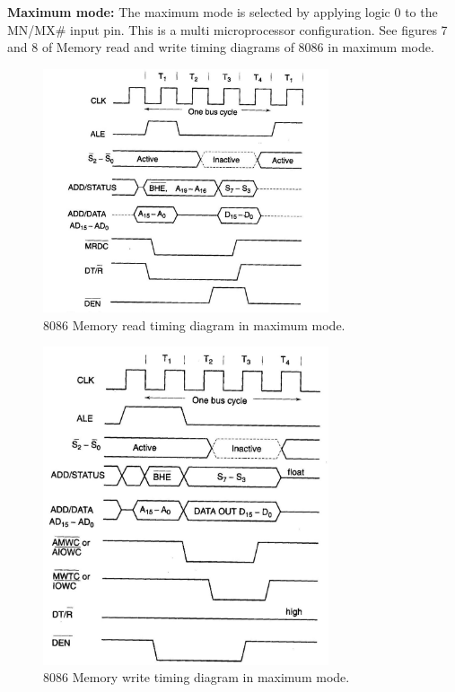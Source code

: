 \documentclass[12pt, a4paper]{scrartcl}
\begin{document}
	\textbf{Maximum mode: }The maximum mode is selected by applying logic 0 to the MN/MX\# input pin. This is a multi microprocessor configuration. See figures 7 and 8 of Memory read and write timing diagrams of 8086 in maximum mode.

	\begin{figure}[h]
		\centering
		\includegraphics[width=0.75\textwidth]{images/8086-max-read.png}
		\caption{8086 Memory read timing diagram in maximum mode.}
		\label{image-7}
	\end{figure}

	\begin{figure}[h]
		\centering
		\includegraphics[width=0.75\textwidth]{images/8086-max-write.png}
		\caption{8086 Memory write timing diagram in maximum mode.}
		\label{image-8}
	\end{figure}
\end{document}
